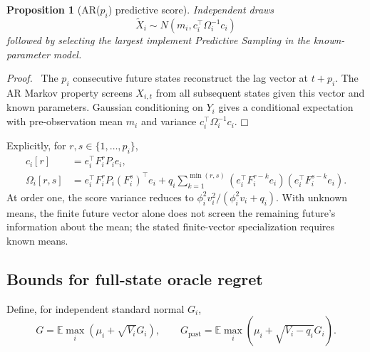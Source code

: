 \documentclass[11pt]{article}
\newtheorem{proposition}[theorem]{Proposition}
\newenvironment{proof}{\par\noindent\textit{Proof.}\ }{\hfill$\mdlgwhtsquare$\par\medskip}
\newcommand{\E}{\mathbb E}
\begin{document}
\begin{proposition}[AR($p_i$) predictive score]
Independent draws
\begin{equation}
\boxed{\widetilde X_i\sim N(m_i,c_i^\top\Omega_i^{-1}c_i)}
\label{eq:ps}
\end{equation}
followed by selecting the largest implement Predictive Sampling in the known-parameter model.
\end{proposition}
\begin{proof}
The $p_i$ consecutive future states reconstruct the lag vector at $t+p_i$. The AR Markov property screens $X_{i,t}$ from all subsequent states given this vector and known parameters. Gaussian conditioning on $Y_i$ gives a conditional expectation with pre-observation mean $m_i$ and variance $c_i^\top\Omega_i^{-1}c_i$.
\end{proof}
Explicitly, for $r,s\in\{1,\ldots,p_i\}$,
\begin{align}
c_i[r]&=e_i^\top F_i^rP_ie_i,\\
\Omega_i[r,s]&=e_i^\top F_i^rP_i(F_i^s)^\top e_i
+q_i\sum_{k=1}^{\min(r,s)}(e_i^\top F_i^{r-k}e_i)(e_i^\top F_i^{s-k}e_i).
\end{align}
At order one, the score variance reduces to $\phi_i^2v_i^2/(\phi_i^2v_i+q_i)$. With unknown means, the finite future vector alone does not screen the remaining future's information about the mean; the stated finite-vector specialization requires known means.

\subsection{Bounds for full-state oracle regret}
Define, for independent standard normal $G_i$,
\begin{equation}
G=\E\max_i(\mu_i+\sqrt{V_i}G_i),\qquad
G_{\mathrm{past}}=\E\max_i(\mu_i+\sqrt{V_i-q_i}G_i).
\end{equation}
\end{document}
